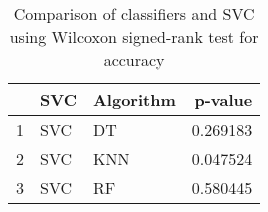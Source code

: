 \begin{table}
\footnotesize
\caption{Comparison of classifiers and SVC using Wilcoxon signed-rank test for accuracy}
\label{tab:SVC wilcoxon ACC comparison}
\begin{tabular}{lllr}
\hline
 & SVC & Algorithm & p-value \\
\hline
1 & SVC & DT & 0.269183 \\
2 & SVC & KNN & 0.047524 \\
3 & SVC & RF & 0.580445 \\
\hline
\end{tabular}
\end{table}
